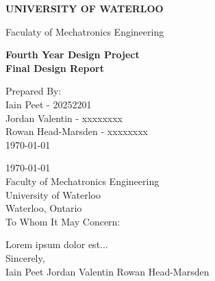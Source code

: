 \documentclass[oneside,final]{report}
\begin{document}
 

\pagestyle{empty}

\begin{flushright}
 \begin{LARGE}
  \textbf{UNIVERSITY OF WATERLOO}
 \end{LARGE}

 \begin{large}
  Faculaty of Mechatronics Engineering\\[4cm]
 \end{large}

 \begin{LARGE}
  \textbf{
    Fourth Year Design Project \\[0.0cm]
    Final Design Report
  }
 \end{LARGE}

 \vfill

  Prepared By: \\[0.2cm]
  Iain Peet - 20252201\\
  Jordan Valentin - xxxxxxxx\\
  Rowan Head-Marsden - xxxxxxxx\\
  \today
\end{flushright}
\clearpage

\today \\[0.5cm]

Faculty of Mechatronics Engineering \\
University of Waterloo \\
Waterloo, Ontario \\

To Whom It May Concern:

Lorem ipsum dolor est... \\[0.5cm]

Sincerely, \\[1cm]

Iain Peet \hspace{4cm} Jordan Valentin \hspace{4cm} Rowan Head-Marsden
\clearpage

\pagestyle{plain}
\setcounter{page}{1}

\tableofcontents

\listoffigures
{}
\end{document}
